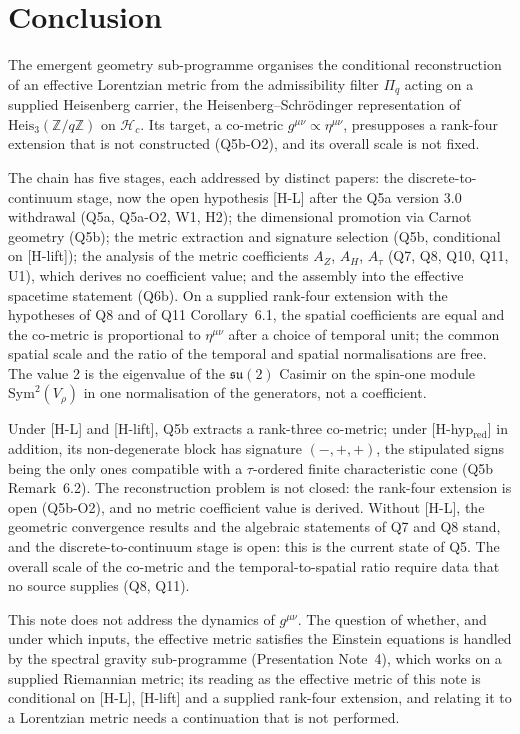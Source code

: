 \documentclass[11pt,a4paper]{article}
\theoremstyle{definition}
\newcommand{\Heis}{\mathrm{Heis}}
\newcommand{\su}{\mathfrak{su}}
\newcommand{\geff}{g^{\mu\nu}}
\newcommand{\Atau}{A_\tau}
\newcommand{\AH}{A_H}
\newcommand{\AZ}{A_Z}
\newcommand{\Sym}{\mathrm{Sym}}
\begin{document}
  \section{Conclusion}
    \label{sec:conclusion}

    The emergent geometry sub-programme organises the conditional reconstruction of an
    effective Lorentzian metric from the admissibility filter $\Pi_q$ acting on a supplied
    Heisenberg carrier, the Heisenberg--Schr\"{o}dinger representation of
    $\Heis_3(\mathbb{Z}/q\mathbb{Z})$ on $\mathcal{H}_c$.
    Its target, a co-metric $\geff \propto \eta^{\mu\nu}$, presupposes a rank-four extension that
    is not constructed (Q5b-O2), and its overall scale is not fixed.

    The chain has five stages, each addressed by distinct papers: the discrete-to-continuum
    stage, now the open hypothesis [H-L] after the Q5a version 3.0 withdrawal (Q5a, Q5a-O2,
    W1, H2); the dimensional promotion via Carnot geometry (Q5b);
    the metric extraction and signature selection (Q5b, conditional on [H-lift]); the analysis of
    the metric coefficients $\AZ$, $\AH$, $\Atau$ (Q7, Q8, Q10, Q11, U1), which derives no
    coefficient value; and the assembly into the effective spacetime statement (Q6b).
    On a supplied rank-four extension with the hypotheses of Q8 and of Q11 Corollary~6.1, the spatial
    coefficients are equal and the co-metric is proportional to $\eta^{\mu\nu}$ after a choice
    of temporal unit; the common spatial scale and the ratio of the temporal and spatial
    normalisations are free.
    The value 2 is the eigenvalue of the $\su(2)$ Casimir on the spin-one module
    $\Sym^2(V_\rho)$ in one normalisation of the generators, not a coefficient.

    Under [H-L] and [H-lift], Q5b extracts a rank-three co-metric; under [H-hyp$_{\mathrm{red}}$] in
    addition, its non-degenerate block has signature $(-,+,+)$, the stipulated signs being the
    only ones compatible with a $\tau$-ordered finite characteristic cone (Q5b Remark~6.2).
    The reconstruction problem is not closed: the rank-four extension is open (Q5b-O2), and no
    metric coefficient value is derived.
    Without [H-L], the geometric convergence results and the algebraic statements of Q7 and Q8
    stand, and the discrete-to-continuum stage is open: this is the current state of Q5.
    The overall scale of the co-metric and the temporal-to-spatial ratio require data that no
    source supplies (Q8, Q11).

    This note does not address the dynamics of $\geff$.
    The question of whether, and under which inputs, the effective metric satisfies the Einstein equations is
    handled by the
    spectral gravity sub-programme (Presentation Note~4), which works on a supplied Riemannian metric; its
    reading as the effective metric of this note is conditional on [H-L], [H-lift] and a supplied rank-four
    extension, and relating it to a Lorentzian metric needs a continuation that is not performed.
\end{document}
